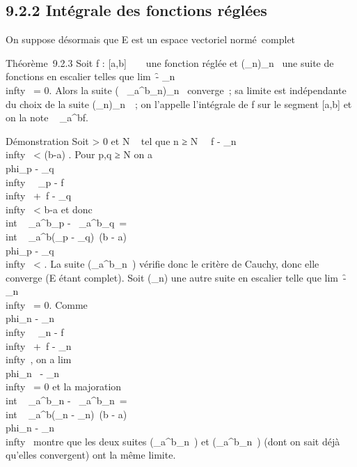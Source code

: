 \documentclass[]{article}
\begin{document}
\subsection{9.2.2 Intégrale des fonctions réglées}

On suppose désormais que E est un espace vectoriel normé~complet

Théorème~9.2.3 Soit f : [a,b] \rightarrow~ ~ une fonction réglée et
(\phi_n)_n\in{}~ une suite de fonctions en escalier telles
que lim~\f -
\phi_n\\infty~ = 0. Alors la suite
\left (\int ~
_a^b\phi_n\right )_n\in{}~
converge~; sa limite est indépendante du choix de la suite
(\phi_n)_n\in{}~~; on l'appelle l'intégrale de f sur le
segment [a,b] et on la note \int ~
_a^bf.

Démonstration Soit \epsilon > 0 et N \in {}~ tel que n ≥ N
\rigtharrow~\ f - \phi_n\\infty~
< \epsilon {}(b-a) . Pour p,q ≥ N on a
\\phi_p -
\phi_q\\infty~ \leq\
\phi_p - f\\infty~ +\
f - \phi_q\\infty~ < \epsilon
\over b-a et donc
\\int ~
_a^b\phi_p -\int ~
_a^b\phi_q\
=\\int ~
_a^b(\phi_p -
\phi_q)\ \leq (b -
a)\\phi_p -
\phi_q\\infty~ < \epsilon. La suite
(\int  _a^b\phi_n~) vérifie
donc le critère de Cauchy, donc elle converge (E étant complet). Soit
(\psi_n) une autre suite en escalier telle que
lim~\f -
\psi_n\\infty~ = 0. Comme
\\phi_n -
\psi_n\\infty~ \leq\
\phi_n - f\\infty~ +\
f - \psi_n\\infty~, on a
lim\\phi_n~ -
\psi_n\\infty~ = 0 et la majoration
\\int ~
_a^b\phi_n -\int ~
_a^b\psi_n\
=\\int ~
_a^b(\phi_n -
\psi_n)\ \leq (b -
a)\\phi_n -
\psi_n\\infty~ montre que les deux suites
(\int  _a^b\phi_n~) et
(\int  _a^b\psi_n~) (dont on
sait déjà qu'elles convergent) ont la même limite.
\end{document}

